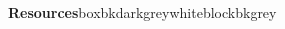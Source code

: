 \documentclass{beamer}
\begin{document}
\begin{frame}[t]
\begin{columns}[T]
\begin{column}{.46\textwidth}
				\begin{customblock}{\textbf{Resources}}{boxbkdarkgrey}{white}{blockbkgrey}
					
				\end{customblock}
			
			\end{column}
			
		\end{columns}

	\end{frame}
\end{document}
